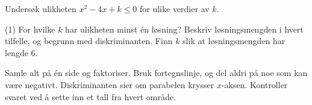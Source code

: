Undersøk ulikheten $x^2 - 4x + k \le 0$ for ulike verdier av $k$.
\begin{tasks}(1)
  \task For hvilke $k$ har ulikheten minst én løsning? Beskriv løsningsmengden i hvert tilfelle, og begrunn med diskriminanten.
  \task Finn $k$ slik at løsningsmengden har lengde 6.
\end{tasks}

\begin{oppsummering}
Samle alt på én side og faktoriser. Bruk fortegnslinje, og del aldri på noe som kan være negativt.
Diskriminanten sier om parabelen krysser $x$-aksen.
Kontroller svaret ved å sette inn et tall fra hvert område.
\end{oppsummering}

